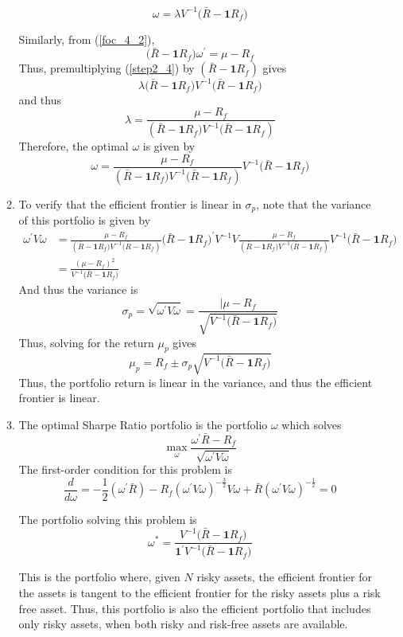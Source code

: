 \documentclass[11pt]{article}
\newcommand{\w}{\omega}
\newcommand{\p}{\prime}
\newcommand{\one}{\mathbf{1}}
\newcommand{\onep}{\mathbf{1}^\prime}
\newcommand{\inv}[1]{#1^{-1}}
\renewcommand{\wp}{\omega^\prime}
\begin{document}
\begin{enumerate}
\begin{enumerate}
		\begin{equation}\label{step2_4}
		\w = \lambda \inv{V} \big(\bar{R} - \one R_f\big)
		\end{equation}
		
		Similarly, from (\ref{foc_4_2}), 
		\[\big(\bar{R} - \one R_f\big)\wp = \mu - R_f\]
		Thus, premultiplying (\ref{step2_4}) by $ (\bar{R} - \one R_f) $ gives
		\[\lambda\big(\bar{R} - \one R_f\big) \inv{V} \big(\bar{R} - \one R_f\big)\]
		and thus
		\[\lambda = \frac{\mu - R_f}{(\bar{R} - \one R_f\big) \inv{V} \big(\bar{R} - \one R_f )}\]
		Therefore, the optimal $ \w $ is given by 
		\[\w = \frac{\mu - R_f}{(\bar{R} - \one R_f\big) \inv{V} \big(\bar{R} - \one R_f )} \inv{V} \big(\bar{R} - \one R_f\big) \]
		
		\item To verify that the efficient frontier is linear in $ \sigma_p $, note that the variance of this portfolio is given by 
		\begin{align*}
		\wp V\w &= \frac{\mu - R_f}{(\bar{R} - \one R_f\big) \inv{V} \big(\bar{R} - \one R_f )} \big(\bar{R} - \one R_f\big)^\p \inv{V} V \frac{\mu - R_f}{(\bar{R} - \one R_f\big) \inv{V} \big(\bar{R} - \one R_f )} \inv{V} \big(\bar{R} - \one R_f\big) \\
		&= \frac{(\mu - R_f)^2}{\inv{V} \big(\bar{R} - \one R_f\big)}
		\end{align*}
		And thus the variance is 
		\[\sigma_p = \sqrt{\wp V \w} = \frac{|\mu - R_f}{\sqrt{\inv{V} \big(\bar{R} - \one R_f\big)}}\]
		Thus, solving for the return $ \mu_p $ gives
		\[\mu_p = R_f \pm \sigma_p \sqrt{\inv{V} \big(\bar{R} - \one R_f\big)}\]
		Thus, the portfolio return is linear in the variance, and thus the efficient frontier is linear. 
		
		\item The optimal Sharpe Ratio portfolio is the portfolio $ \w $ which solves
		\[\max_\w \frac{\wp\bar{R} - R_f}{\sqrt{\wp V \w}}\]
		The first-order condition for this problem is 
		\[\frac{d}{d\w} = -\frac{1}{2}(\wp \bar{R}) - R_f (\wp V \w)^{-\frac{3}{2}} V\w + \bar{R}(\wp V \w)^{-\frac{1}{2}} = 0 \]
		
		The portfolio solving this problem is 
		\[\w^* = \frac{\inv{V}\big(\bar{R} - \one R_f\big)}{\onep \inv{V} \big(\bar{R} - \one R_f\big)} \]
		
		This is the portfolio where, given $ N $ risky assets, the efficient frontier for the assets is tangent to the efficient frontier for the risky assets plus a risk free asset. Thus, this portfolio is also the efficient portfolio that includes only risky assets, when both risky and risk-free assets are available. 
	\end{enumerate}
\end{enumerate}
\end{document}
